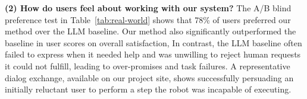 \textbf{(2) How do users feel about working with our system?
} The A/B blind preference test in Table~\ref{tab:real-world} shows that 78\% of users preferred our method over the LLM baseline.
Our method also significantly outperformed the baseline in user scores on overall satisfaction,  In contrast, the LLM baseline often failed to express when it needed help and was unwilling to reject human requests it could not fulfill, leading to over-promises and task failures. A representative dialog exchange, available
on our project site,\footnotemark[1]
shows \methodname{} successfully persuading an initially reluctant user to perform a step the robot was incapable of executing.



